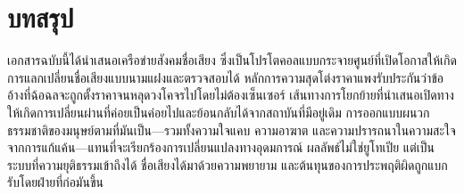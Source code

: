 \documentclass[11pt,a4paper,twocolumn]{article}
\begin{document}
\section{บทสรุป}

เอกสารฉบับนี้ได้นำเสนอเครือข่ายสังคมชื่อเสียง ซึ่งเป็นโปรโตคอลแบบกระจายศูนย์ที่เปิดโอกาสให้เกิดการแลกเปลี่ยนชื่อเสียงแบบนามแฝงและตรวจสอบได้ หลักการความสุดโต่งราคาแพงรับประกันว่าข้ออ้างที่ฉ้อฉลจะถูกตั้งราคาจนหลุดวงโคจรไปโดยไม่ต้องเซ็นเซอร์ เส้นทางการโยกย้ายที่นำเสนอเปิดทางให้เกิดการเปลี่ยนผ่านที่ค่อยเป็นค่อยไปและย้อนกลับได้จากสถาบันที่มีอยู่เดิม การออกแบบผนวกธรรมชาติของมนุษย์ตามที่มันเป็น---รวมทั้งความใจแคบ ความอาฆาต และความปรารถนาในความสะใจจากการแก้แค้น---แทนที่จะเรียกร้องการเปลี่ยนแปลงทางอุดมการณ์ ผลลัพธ์ไม่ใช่ยูโทเปีย แต่เป็นระบบที่ความยุติธรรมเข้าถึงได้ ชื่อเสียงได้มาด้วยความพยายาม และต้นทุนของการประพฤติผิดถูกแบกรับโดยฝ่ายที่ก่อมันขึ้น


\end{document}
